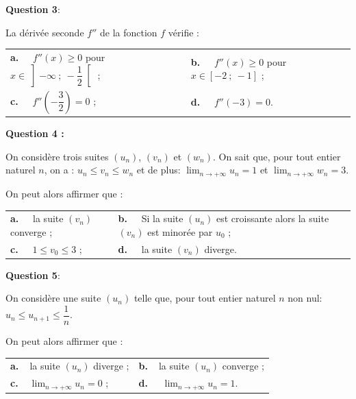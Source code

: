 \medskip

\textbf{Question 3}:

La dérivée seconde $f''$ de la fonction $f$ vérifie :

\begin{center}
\begin{tabularx}{\linewidth}{X X}
\textbf{a.~~} $f''(x) \geqslant  0$ pour $x \in \left]-\infty~;~- \dfrac12\right[$ ; &\textbf{b.~~} $f''(x) \geqslant  0$ pour $x \in [- 2~;~- 1]$ ;\\
\textbf{c.~~} $f''\left(- \dfrac32 \right) = 0$ ;&\textbf{d.~~} $f''(- 3) = 0$.
\end{tabularx}
\end{center}


\textbf{Question 4 :}

\medskip

On considère trois suites $\left(u_n\right)$, $\left(v_n\right)$ et $\left(w_n\right)$. On sait que, pour tout entier naturel $n$, on a : $u_n \leqslant v_n\leqslant  w_n$ et de plus: $\displaystyle\lim_{n \to + \infty} u_n= 1$ et $\displaystyle\lim_{n \to + \infty} w_n= 3$.

On peut alors affirmer que :

\begin{center}
\begin{tabularx}{\linewidth}{X X}
\textbf{a.~~} la suite $\left(v_n\right)$ converge ;&\textbf{b.~~} Si la suite 
$\left(u_n\right)$ est croissante alors la suite $\left(v_n\right)$ est minorée par $u_0$ ;\\
\textbf{c.~~} $1 \leqslant  v_0 \leqslant 3$ ;&\textbf{d.~~} la suite $\left(v_n\right)$ diverge.
\end{tabularx}
\end{center}


\medskip

\textbf{Question 5}:

\medskip

On considère une suite $\left(u_n\right)$ telle que, pour tout entier naturel $n$ non nul: $u_n \leqslant  u_{n+1}  \leqslant \dfrac1n$.

On peut alors affirmer que : 

\begin{center}
\begin{tabularx}{\linewidth}{X X}
\textbf{a.~~}la suite $\left(u_n\right)$ diverge ;&\textbf{b.~~}la suite $\left(u_n\right)$ converge ;\\
\textbf{c.~~}$\displaystyle\lim_{n \to + \infty} u_n =  0$ ;&\textbf{d.~~} $\displaystyle\lim_{n \to + \infty} u_n =  1$.
\end{tabularx}
\end{center}

